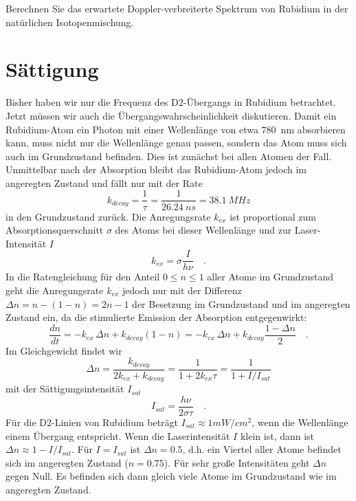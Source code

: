 \begin{questions}
	\item Berechnen Sie das erwartete Doppler-verbreiterte Spektrum von Rubidium in der natürlichen Isotopenmischung.
	\label{FzV:doppler_theo}
\end{questions}


\section{Sättigung}

Bisher haben wir nur die Frequenz des D2-Übergangs in Rubidium betrachtet. Jetzt müssen wir auch die Übergangswahrscheinlichkeit diskutieren. Damit ein Rubidium-Atom ein Photon mit einer Wellenlänge von etwa 780~nm absorbieren kann, muss nicht nur die Wellenlänge genau passen, sondern das Atom muss sich auch im Grundzustand befinden. Dies ist zunächst bei allen Atomen der Fall. Unmittelbar nach der Absorption bleibt das Rubidium-Atom jedoch im angeregten Zustand und fällt nur mit der Rate 
\begin{equation}
	k_{decay} = \frac{1}{\tau} = \frac{1}{26.24~ns} = 38.1~MHz
\end{equation}
in den Grundzustand zurück. Die Anregungsrate $k_{ex}$ ist proportional zum Absorptionsquerschnitt $\sigma$ des Atoms bei dieser Wellenlänge und zur Laser-Intensität $I$
\begin{equation}
	k_{ex} = \sigma \frac{I}{h \nu} \quad .
\end{equation}
In die Ratengleichung für den Anteil $0 \le n \le 1$ aller Atome im Grundzustand geht die Anregungsrate $k_{ex}$ jedoch nur mit der Differenz $\Delta n = n - (1-n) = 2n -1$ der Besetzung im Grundzustand und im angeregten Zustand ein, da die stimulierte Emission der Absorption entgegenwirkt:
\begin{equation}
	\frac{d n}{dt} = - k_{ex} \, \Delta n + k_{decay} (1-n) = - k_{ex} \, \Delta n + k_{decay} \frac{1 - \Delta n}{2} \quad .
\end{equation}
 Im Gleichgewicht findet wir
\begin{equation}
	\Delta n = \frac{k_{decay}}{2 k_{ex}+ k_{decay}} = \frac{1}{1 + 2 k_{ex} \tau } = \frac{1}{1 + I / I_{sat}}
\end{equation}
mit der Sättigungsintensität $I_{sat}$
\begin{equation}
	I_{sat} = \frac{h \nu}{2 \sigma \tau } \quad .
\end{equation}
Für die D2-Linien von Rubidium beträgt $I_{sat} \approx 1 mW/cm^2$, wenn die Wellenlänge einem Übergang entspricht.
Wenn die Laserintensität $I$ klein ist, dann ist $\Delta n \approx 1 - I / I_{sat}$. Für $I = I_{sat}$ ist $\Delta n = 0.5$, d.h. ein Viertel aller Atome befindet sich im angeregten Zustand ($n=0.75$). Für sehr große Intensitäten geht $\Delta n$ gegen Null. Es befinden sich dann gleich viele Atome im Grundzustand wie im angeregten Zustand.

